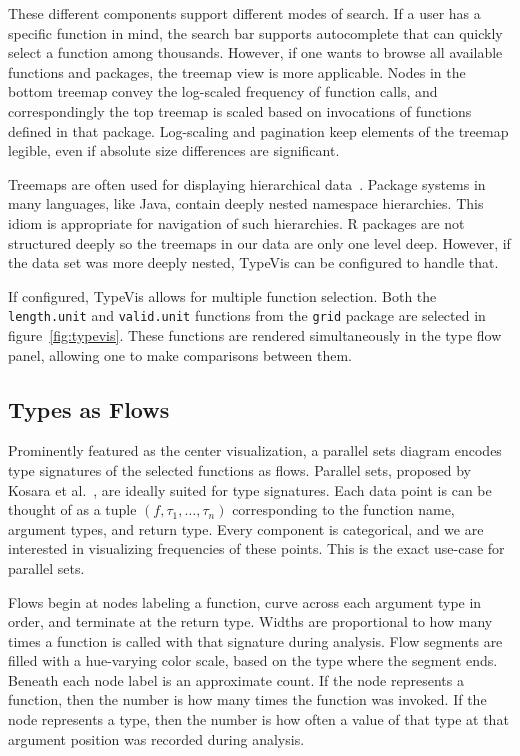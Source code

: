 \documentclass{vgtc}                          %
\newcommand{\typevis}{{\sc TypeVis}\xspace}
\begin{document}
These different components support different modes of search.
If a user has a specific function in mind,
the search bar supports autocomplete
that can quickly select a function among thousands.
However, if one wants to browse
all available functions and packages,
the treemap view is more applicable.
Nodes in the bottom treemap convey the log-scaled
frequency of function calls,
and correspondingly the top treemap
is scaled based on invocations
of functions defined in that package.
Log-scaling and pagination keep
elements of the treemap legible,
even if absolute size differences are significant.

Treemaps are often used for displaying hierarchical data~\cite{shneiderman:1992}.
Package systems in many languages,
like Java,
contain deeply nested namespace hierarchies.
This idiom is appropriate for navigation of such
hierarchies.
R packages are not structured deeply
so the treemaps in our data are only one
level deep.
However, if the data set was more deeply nested,
\typevis can be configured to
handle that.

If configured, \typevis allows for multiple function selection.
Both the {\tt length.unit} and {\tt valid.unit} functions
from the {\tt grid} package are selected in figure~\ref{fig:typevis}.
These functions are rendered simultaneously in the type flow
panel, allowing one to make comparisons between them.

\subsection{Types as Flows}

Prominently featured as the center visualization,
a parallel sets diagram encodes type signatures of the selected
functions as flows.
Parallel sets,
proposed by Kosara et al.~\cite{kosara:2006},
are ideally suited for type signatures.
Each data point is can be thought of as
a tuple $(f, \tau_1, \ldots, \tau_n)$
corresponding to the function name,
argument types,
and return type.
Every component is categorical,
and we are interested in visualizing frequencies of these points.
This is the exact use-case for parallel sets.

Flows begin at nodes labeling a function,
curve across each argument type in order,
and terminate at the return type.
Widths are proportional to how many times a function
is called with that signature during analysis.
Flow segments are filled with a hue-varying color scale,
based on the type where the segment ends.
Beneath each node label is an approximate count.
If the node represents a function, then the
number is how many times the function was invoked.
If the node represents a type, then the
number is how often a value of that type
at that argument position was recorded during analysis.
\end{document}
